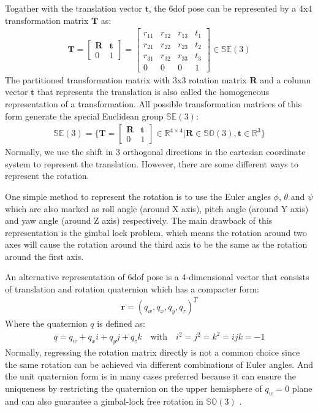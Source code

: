 \documentclass[12pt,DIV14,BCOR12mm,a4paper,footinclude=false,headinclude,parskip=half-,twoside,openright,cleardoublepage=empty,toc=index,bibliography=totoc,listof=totoc]{scrreprt}
\numberwithin{equation}{chapter}
\begin{document}
Togather with the translation vector $\mathbf{t}$, the \gls{6dof} pose can be represented by a 4x4 transformation matrix $\mathbf{T}$ as:
\begin{align}
  \mathbf{T} = \begin{bmatrix}
    \mathbf{R} & \mathbf{t} \\
    0 & 1
  \end{bmatrix}
  = \begin{bmatrix}
    r_{11} & r_{12} & r_{13} & t_{1} \\
    r_{21} & r_{22} & r_{23} & t_{2} \\
    r_{31} & r_{32} & r_{33} & t_{3} \\
    0 & 0 & 0 & 1
  \end{bmatrix}
  \in \mathbb{S} \mathbb{E} (3)
\end{align}
The partitioned transformation matrix with 3x3 rotation matrix $\mathbf{R}$ and a column vector $\mathbf{t}$ that represents the translation is also called the homogeneous representation of a transformation. All possible transformation matrices of this form generate the special Euclidean group $\mathbb{S} \mathbb{E} (3)$:
\begin{align}
  \mathbb{S} \mathbb{E} (3) = \{\mathbf{T} = \begin{bmatrix}
    \mathbf{R} & \mathbf{t} \\
    0 & 1
  \end{bmatrix}\in \mathbb{R}^{4 \times 4}| \mathbf{R} \in \mathbb{S} \mathbb{O} (3), \mathbf{t} \in \mathbb{R}^{3} \}
\end{align}
Normally, we use the shift in 3 orthogonal directions in the cartesian coordinate system to represent the translation. However, there are some different ways to represent the rotation.

One simple method to represent the rotation is to use the Euler angles $\phi$, $\theta$ and $\psi$ which are also marked as roll angle (around X axis), pitch angle (around Y axis) and yaw angle (around Z axis) respectively. The main drawback of this representation is the gimbal lock problem, which means the rotation around two axes will cause the rotation around the third axis to be the same as the rotation around the first axis.

An alternative representation of \gls{6dof} pose is a 4-dimensional vector that consists of translation and rotation quaternion which has a compacter form:
\begin{align}
  \mathbf{r} = (q_{w}, q_{x}, q_{y}, q_{z})^{T}
\end{align}
Where the quaternion $q$ is defined as:
\begin{align}
  q = q_{w} + q_{x}i + q_{y}j + q_{z}k \quad \textrm{with} \quad i^{2} = j^{2} = k^{2} = ijk = -1
\end{align}
Normally, regressing the rotation matrix directly is not a common choice since the same rotation can be achieved via different combinations of Euler angles. And the unit quaternion form is in many cases preferred because it can ensure the uniqueness by restricting the quaternion on the upper hemisphere of $q_{w}=0$ plane and can also guarantee a gimbal-lock free rotation in $\mathbb{S} \mathbb{O} (3)$ \cite{9231126}. 
\end{document}
